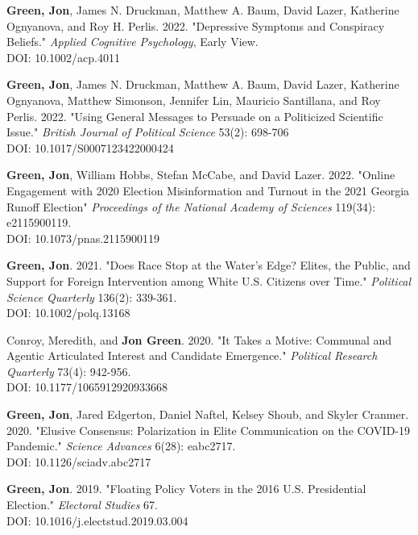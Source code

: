 \documentclass[letterpaper]{article}
\begin{document}
\begin{etaremune}
\item \textbf{Green, Jon}, James N. Druckman, Matthew A. Baum, David Lazer, Katherine Ognyanova, and Roy H. Perlis. 2022. "Depressive Symptoms and Conspiracy Beliefs." \textit{Applied Cognitive Psychology}, Early View. \\
DOI: 10.1002/acp.4011

\item  \textbf{Green, Jon}, James N. Druckman, Matthew A. Baum, David Lazer, Katherine Ognyanova, Matthew Simonson, Jennifer Lin, Mauricio Santillana, and Roy Perlis. 2022. "Using General Messages to Persuade on a Politicized Scientific Issue." \textit{British Journal of Political Science} 53(2): 698-706 \\
DOI: 10.1017/S0007123422000424

\item  \textbf{Green, Jon}, William Hobbs, Stefan McCabe, and David Lazer. 2022. "Online Engagement with 2020 Election Misinformation and Turnout in the 2021 Georgia Runoff Election"  \textit{Proceedings of the National Academy of Sciences}  119(34): e2115900119. \\
DOI: 10.1073/pnas.2115900119

\item \textbf{Green, Jon}. 2021. "Does Race Stop at the Water's Edge? Elites, the Public, and Support for Foreign Intervention among White U.S. Citizens over Time." \textit{Political Science Quarterly} 136(2): 339-361. \\
DOI: 10.1002/polq.13168

\item Conroy, Meredith, and \textbf{Jon Green}. 2020. "It Takes a Motive: Communal and Agentic Articulated Interest and Candidate Emergence."  \textit{Political Research Quarterly} 73(4): 942-956. \\
DOI: 10.1177/1065912920933668

\item \textbf{Green, Jon}, Jared Edgerton, Daniel Naftel, Kelsey Shoub, and Skyler Cranmer. 2020. "Elusive Consensus: Polarization in Elite Communication on the COVID-19 Pandemic." \textit{Science Advances} 6(28): eabc2717. \\
DOI: 10.1126/sciadv.abc2717

\item \textbf{Green, Jon}. 2019. "Floating Policy Voters in the 2016 U.S. Presidential Election." \textit{Electoral Studies} 67. \\
DOI: 10.1016/j.electstud.2019.03.004


\end{etaremune}
\end{document}
